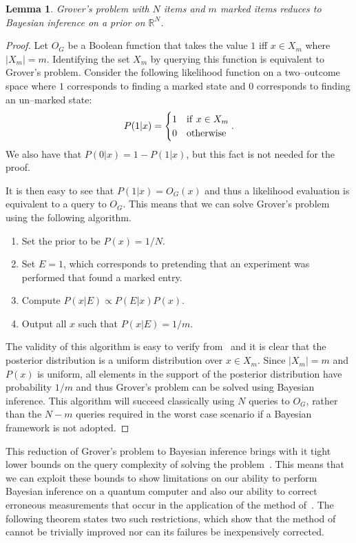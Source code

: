 \documentclass[aps,amsmath,onecolumn,amssymb]{revtex4}
\newtheorem{lemma}{Lemma}
\begin{document}
\begin{lemma}\label{lem:reduce}
Grover's problem with $N$ items and $m$ marked items reduces to Bayesian inference on a prior on $\mathbb{R}^N$.
\end{lemma}
\begin{proof}
Let $O_G$ be a Boolean function that takes the value $1$ iff $x\in X_m$ where $|X_m|=m$.  Identifying the set $X_m$ by querying this function is equivalent to Grover's problem.  Consider the following likelihood function on a two--outcome space where $1$ corresponds to finding a marked state and $0$ corresponds to finding an un--marked state:
\begin{equation}
P(1|x) = \begin{cases} 1 & {\rm if~}x\in X_m\\ 0& {\rm otherwise} \end{cases}.\label{eq:reduceLikelihood}
\end{equation}
We also have that $P(0|x)=1-P(1|x)$, but this fact is not needed for the proof.

It is then easy to see that $P(1|x)=O_G(x)$ and thus a likelihood evaluation is equivalent to a query to $O_G$.  This means that we can solve Grover's problem using the following algorithm.  \begin{enumerate}
\item Set the prior to be $P(x) = 1/N$.
\item Set $E=1$, which corresponds to pretending that an experiment was performed that found a marked entry.  
\item Compute $P(x|E) \propto P(E|x)P(x)$.  
\item Output all $x$ such that $P(x|E)=1/m$.
\end{enumerate}

The validity of this algorithm is easy to verify from~ and it is clear that the posterior distribution is a uniform distribution over $x\in X_m$.  Since $|X_m|=m$ and $P(x)$ is uniform, all elements in the support of the posterior distribution have probability $1/m$ and thus Grover's problem can be solved using Bayesian inference.  This algorithm will succeed classically using $N$ queries to $O_G$, rather than the $N-m$ queries required in the worst case scenario if a Bayesian framework is not adopted.


\end{proof}

This reduction of Grover's problem to Bayesian inference brings with it tight lower bounds on the query complexity of solving the problem~\cite{BGH+96}.  This means that we can exploit these bounds to show limitations on our ability to perform Bayesian inference on a quantum computer and also our ability to correct erroneous measurements that occur in the application of the method of~.  The following theorem states two such restrictions, which show that the method of~ cannot be trivially improved nor can its failures be inexpensively corrected.
\end{document}
